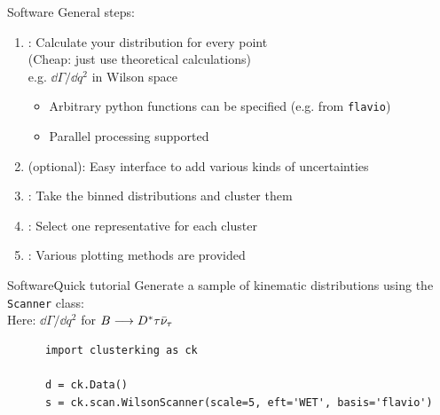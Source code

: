 \begin{frame}{Software}
    General steps:
    \begin{enumerate}
        \item {}: Calculate your distribution for every point\\ (Cheap: just use theoretical calculations)\\
        {\footnotesize e.g. $\dd\Gamma/\dd q^2$ in Wilson space}
        \begin{itemize}
            \item Arbitrary python functions can be specified (e.g. from \texttt{flavio})
            \item Parallel processing supported
        \end{itemize}
        \item {} (optional): Easy interface to add various kinds of uncertainties\\
        \item {}: Take the binned distributions and cluster them\\
        \item {}: Select one representative for each cluster
        \item {}: Various plotting methods are provided
    \end{enumerate}
\end{frame}

\begin{frame}[t, fragile]{Software}{Quick tutorial}
    Generate a sample of kinematic distributions using the \texttt{Scanner} class:\\
    {\footnotesize Here: $\dd\Gamma/\dd q^2$ for $B\longrightarrow D^*\tau\bar\nu_\tau$}
    
    \begin{verbatim}
      import clusterking as ck
      
      d = ck.Data()
      s = ck.scan.WilsonScanner(scale=5, eft='WET', basis='flavio')
    \end{verbatim}

\end{frame}

